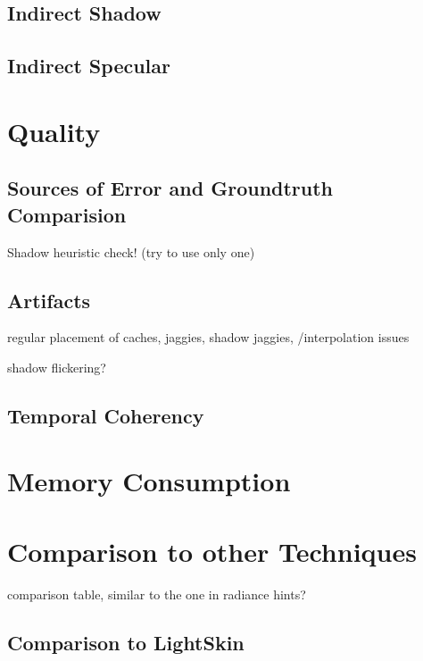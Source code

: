 \documentclass[thesis.tex]{subfiles}
\begin{document}
\subsection{Indirect Shadow}


\subsection{Indirect Specular}

\newpage

\section{Quality}

\subsection{Sources of Error and Groundtruth Comparision}
Shadow heuristic check! (try to use only one)

\subsection{Artifacts}
regular placement of caches, jaggies,
shadow jaggies,
/interpolation issues

shadow flickering?

\subsection{Temporal Coherency}


\section{Memory Consumption}

\section{Comparison to other Techniques} \label{sec:eva:comparisiontoother}

comparison table, similar to the one in radiance hints?

\subsection{Comparison to LightSkin}

\subfilebib %
\end{document}
